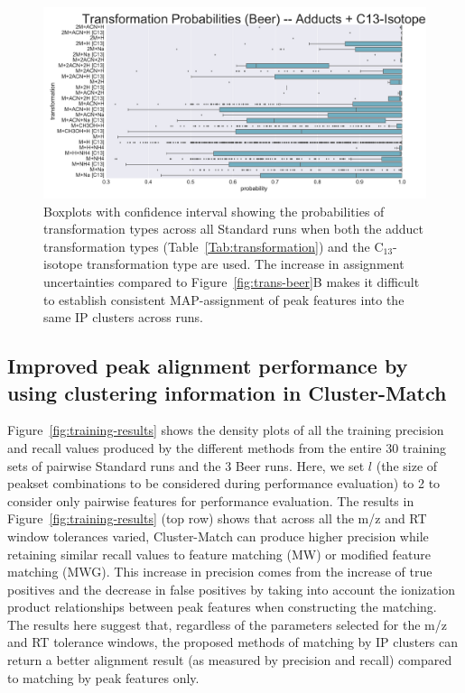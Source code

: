 \begin{figure}[!htbp]
\centering
\includegraphics[width=0.5\linewidth]{05-precursor-cluster/figures/prob_trans_Beer_2.pdf}
\caption{\label{fig:more-uncertainty} Boxplots with confidence interval showing the probabilities of transformation types across all Standard runs when both the adduct transformation types (Table~\ref{Tab:transformation}) and the C$_{13}$-isotope transformation type are used. The increase in assignment uncertainties compared to Figure~\ref{fig:trans-beer}B makes it difficult to establish consistent MAP-assignment of peak features into the same IP clusters across runs. }
\end{figure}

\subsection{Improved peak alignment performance by using clustering information in Cluster-Match}

Figure~\ref{fig:training-results} shows the density plots of all the training precision and recall values produced by the different methods from the entire 30 training sets of pairwise Standard runs and the 3 Beer runs. Here, we set $l$ (the size of peakset combinations to be considered during performance evaluation) to 2 to consider only pairwise features for performance evaluation. The results in Figure~\ref{fig:training-results} (top row) shows that across all the m/z and RT window tolerances varied, Cluster-Match can produce higher precision while retaining similar recall values to feature matching (MW) or modified feature matching (MWG). This increase in precision comes from the increase of true positives and the decrease in false positives by taking into account the ionization product relationships between peak features when constructing the matching. The results here suggest that, regardless of the parameters selected for the m/z and RT tolerance windows, the proposed methods of matching by IP clusters can return a better alignment result (as measured by precision and recall) compared to matching by peak features only.

